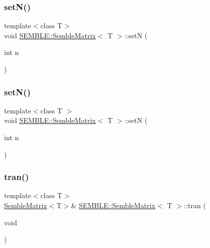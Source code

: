 \mbox{\label{structSEMBLE_1_1SembleMatrix_abd156f95830c6b27aac722d4346901cc}} 
\subsubsection{\texorpdfstring{setN()}{setN()}\hspace{0.1cm}{\footnotesize\ttfamily [1/2]}}
{\footnotesize\ttfamily template$<$class T$>$ \\
void \mbox{\hyperlink{structSEMBLE_1_1SembleMatrix}{S\+E\+M\+B\+L\+E\+::\+Semble\+Matrix}}$<$ T $>$\+::setN (\begin{DoxyParamCaption}\item[{int}]{n }\end{DoxyParamCaption})}

\mbox{\label{structSEMBLE_1_1SembleMatrix_abd156f95830c6b27aac722d4346901cc}} 
\subsubsection{\texorpdfstring{setN()}{setN()}\hspace{0.1cm}{\footnotesize\ttfamily [2/2]}}
{\footnotesize\ttfamily template$<$class T $>$ \\
void \mbox{\hyperlink{structSEMBLE_1_1SembleMatrix}{S\+E\+M\+B\+L\+E\+::\+Semble\+Matrix}}$<$ T $>$\+::setN (\begin{DoxyParamCaption}\item[{int}]{n }\end{DoxyParamCaption})}

\mbox{\label{structSEMBLE_1_1SembleMatrix_a1f306991f4b4e22697c8b1c5e1fc9d66}} 
\subsubsection{\texorpdfstring{tran()}{tran()}\hspace{0.1cm}{\footnotesize\ttfamily [1/2]}}
{\footnotesize\ttfamily template$<$class T$>$ \\
\mbox{\hyperlink{structSEMBLE_1_1SembleMatrix}{Semble\+Matrix}}$<$T$>$\& \mbox{\hyperlink{structSEMBLE_1_1SembleMatrix}{S\+E\+M\+B\+L\+E\+::\+Semble\+Matrix}}$<$ T $>$\+::tran (\begin{DoxyParamCaption}\item[{void}]{ }\end{DoxyParamCaption})\hspace{0.3cm}{\ttfamily [inline]}}

